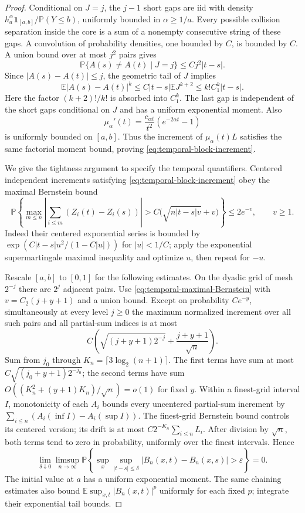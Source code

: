 \documentclass[11pt,letterpaper]{article}
\newcommand{\PP}{\mathbb P}\newcommand{\EE}{\mathbb E}
\newcommand{\ind}{\mathbf 1}\newcommand{\Exp}{\operatorname{Exp}}
\begin{document}
\begin{proof}
Conditional on $J=j$, the $j-1$ short gaps are iid with density
$h_a^\alpha\ind_{[a,b]}/\PP(Y\le b)$, uniformly bounded in
$\alpha\ge1/a$. Every possible collision separation inside the
core is a sum of a nonempty consecutive string of these gaps.
A convolution of probability densities, one bounded by $C$,
is bounded by $C$. A union bound over at most $j^2$ pairs gives
\[
 \PP\{A(s)\ne A(t)\mid J=j\}\le Cj^2|t-s|.
\]
Since $|A(s)-A(t)|\le j$, the geometric tail of $J$ implies
\[
 \EE|A(s)-A(t)|^k
   \le C|t-s|\EE J^{k+2}\le k!C_1^k|t-s|.
\]
Here the factor $(k+2)!/k!$ is absorbed into $C_1^k$.
The last gap is independent of the short gaps conditional on
$J$ and has a uniform exponential moment. Also
\[
 \mu_\alpha'(t)
       =\frac{c_{\alpha t}}{t^2}(e^{-2\alpha t}-1)
\]
is uniformly bounded on $[a,b]$. Thus the increment of
$\mu_\alpha(t)L$ satisfies the same factorial moment bound,
proving \eqref{eq:temporal-block-increment}.

We give the tightness argument to specify the temporal
quantifiers. Centered independent increments satisfying
\eqref{eq:temporal-block-increment} obey the maximal Bernstein
bound
\begin{equation}\label{eq:temporal-maximal-Bernstein}
 \PP\left\{\max_{m\le n}\left|
       \sum_{i\le m}(Z_i(t)-Z_i(s))\right|
       >C\big(\sqrt{n|t-s|v}+v\big)\right\}\le2e^{-v},
       \qquad v\ge1.
\end{equation}
Indeed their centered exponential series is bounded by
$\exp(C|t-s|u^2/(1-C|u|))$ for $|u|<1/C$;
apply the exponential supermartingale maximal inequality and
optimize $u$, then repeat for $-u$.

Rescale $[a,b]$ to $[0,1]$ for the following estimates. On the
dyadic grid of mesh $2^{-j}$ there are $2^j$ adjacent pairs.
Use \eqref{eq:temporal-maximal-Bernstein} with
$v=C_2(j+y+1)$ and a union bound. Except on probability
$Ce^{-y}$, simultaneously at every level $j\ge0$ the maximum
normalized increment over all such pairs and all partial-sum
indices is at most
\[
 C\left(\sqrt{(j+y+1)2^{-j}}
                         +\frac{j+y+1}{\sqrt n}\right).
\]
Sum from $j_0$ through
$K_n=\lceil3\log_2(n+1)\rceil$. The first terms have sum at
most $C\sqrt{(j_0+y+1)2^{-j_0}}$; the second terms have sum
$O((K_n^2+(y+1)K_n)/\sqrt n)=o(1)$ for fixed $y$.
Within a finest-grid interval $I$, monotonicity of each $A_i$
bounds every uncentered partial-sum increment by
$\sum_{i\le n}(A_i(\inf I)-A_i(\sup I))$.
The finest-grid Bernstein bound controls its centered version;
its drift is at most $C2^{-K_n}\sum_{i\le n}L_i$.
After division by $\sqrt n$, both terms tend to zero in
probability, uniformly over the finest intervals.
Hence
\begin{equation}\label{eq:temporal-sequential-modulus}
 \lim_{\delta\downarrow0}\limsup_{n\to\infty}
 \PP\left\{\sup_x\sup_{|t-s|\le\delta}
        |B_n(x,t)-B_n(x,s)|>\varepsilon\right\}=0.
\end{equation}
The initial value at $a$ has a uniform exponential moment.
The same chaining estimates also bound
$\EE\sup_{x,t}|B_n(x,t)|^p$ uniformly for each fixed $p$;
integrate their exponential tail bounds.


\end{proof}
\end{document}
